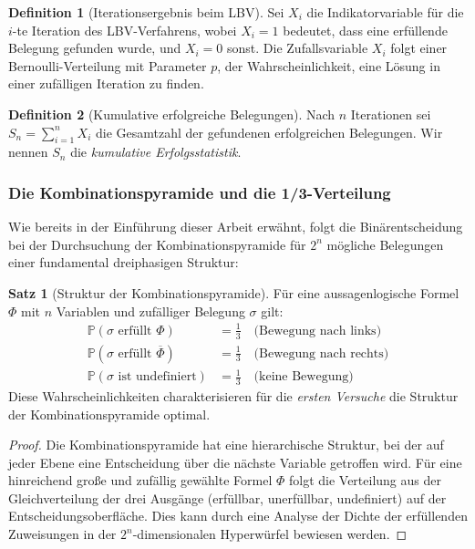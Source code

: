 ﻿\documentclass[a4paper,12pt]{article}
\theoremstyle{definition}
\newtheorem{definition}{Definition}
\newtheorem{satz}{Satz}
\begin{document}
\begin{definition}[Iterationsergebnis beim LBV]
Sei $X_i$ die Indikatorvariable für die $i$-te Iteration des LBV-Verfahrens, wobei $X_i = 1$ bedeutet, dass eine erfüllende Belegung gefunden wurde, und $X_i = 0$ sonst. Die Zufallsvariable $X_i$ folgt einer Bernoulli-Verteilung mit Parameter $p$, der Wahrscheinlichkeit, eine Lösung in einer zufälligen Iteration zu finden.
\end{definition}

\begin{definition}[Kumulative erfolgreiche Belegungen]
Nach $n$ Iterationen sei $S_n = \sum_{i=1}^{n} X_i$ die Gesamtzahl der gefundenen erfolgreichen Belegungen. Wir nennen $S_n$ die \emph{kumulative Erfolgsstatistik}.
\end{definition}

\subsubsection{Die Kombinationspyramide und die 1/3-Verteilung}

Wie bereits in der Einführung dieser Arbeit erwähnt, folgt die Binärentscheidung bei der Durchsuchung der Kombinationspyramide für $2^n$ mögliche Belegungen einer fundamental dreiphasigen Struktur:

\begin{satz}[Struktur der Kombinationspyramide]
Für eine aussagenlogische Formel $\Phi$ mit $n$ Variablen und zufälliger Belegung $\sigma$ gilt:
\begin{align}
\mathbb{P}(\sigma \text{ erfüllt } \Phi) &= \frac{1}{3} \quad \text{(Bewegung nach links)} \\
\mathbb{P}(\sigma \text{ erfüllt } \overline{\Phi}) &= \frac{1}{3} \quad \text{(Bewegung nach rechts)} \\
\mathbb{P}(\sigma \text{ ist undefiniert}) &= \frac{1}{3} \quad \text{(keine Bewegung)}
\end{align}
Diese Wahrscheinlichkeiten charakterisieren für die \emph{ersten Versuche} die Struktur der Kombinationspyramide optimal.
\end{satz}

\begin{proof}
Die Kombinationspyramide hat eine hierarchische Struktur, bei der auf jeder Ebene eine Entscheidung über die nächste Variable getroffen wird. Für eine hinreichend große und zufällig gewählte Formel $\Phi$ folgt die Verteilung aus der Gleichverteilung der drei Ausgänge (erfüllbar, unerfüllbar, undefiniert) auf der Entscheidungsoberfläche. Dies kann durch eine Analyse der Dichte der erfüllenden Zuweisungen in der $2^n$-dimensionalen Hyperwürfel bewiesen werden.
\end{proof}
\end{document}
